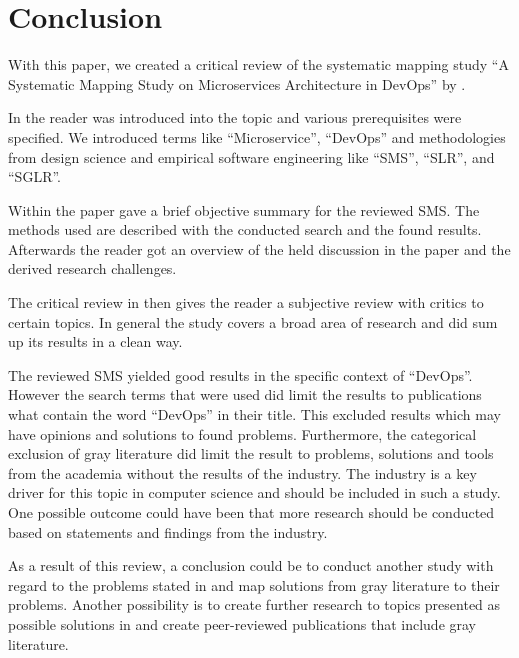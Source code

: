 \section{Conclusion}

With this paper, we created a critical review
of the systematic mapping study
``A Systematic Mapping Study on Microservices Architecture in DevOps''
by \smsAuthors \wsl.

In  the reader was introduced into the
topic and various prerequisites were specified. We introduced
terms like ``Microservice'', ``DevOps'' and methodologies from
design science and empirical software engineering like ``SMS'',
``SLR'', and ``SGLR''.

Within  the paper gave a brief objective
summary for the reviewed SMS. The methods used are described
with the conducted search and the found results. Afterwards
the reader got an overview of the held discussion in the paper
and the derived research challenges.

The critical review in  then gives the
reader a subjective review with critics to certain topics.
In general the study covers a broad area of research
and did sum up its results in a clean way.

The reviewed SMS yielded good results in the specific
context of ``DevOps''. However the search terms that were
used did limit the results to publications what contain the
word ``DevOps'' in their title. This excluded results which
may have opinions and solutions to found problems.
Furthermore, the categorical exclusion of gray literature
did limit the result to problems, solutions and tools from the
academia without the results of the industry. The industry is a key driver
for this topic in computer science and should be
included in such a study. One possible outcome could have been
that more research should be conducted based on statements and
findings from the industry.

As a result of this review, a conclusion could be to conduct
another study with regard to the problems stated in \wsls and
map solutions from gray literature to their problems. Another
possibility is to create further research to topics
presented as possible solutions in  and
create peer-reviewed publications that include gray literature.
